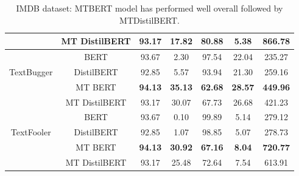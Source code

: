 \documentclass[%
	BCOR=8mm, %
	DIV=12,
	toc=bibliography, %
	toc=listof, %
	oneside, %
	egregdoesnotlikesansseriftitles, %
	]{scrbook}
\begin{document}
\begin{table}[H]
{\begin{tabular}{|c|c|c|c|c|c|c|}
                & MT DistilBERT &                93.17 &                    17.82 &                  80.88 &                      5.38 &           866.78 \\
                \midrule
                 & BERT &                93.67 &                     2.30 &                  97.54 &                     22.04 &           235.27 \\
               TextBugger & DistilBERT &                92.85 &                     5.57 &                  93.94 &                     21.30 &           259.16 \\
                & MT BERT &                \textbf{94.13} &                    \textbf{35.13} &                 \textbf{ 62.68} &                     \textbf{28.57} &           \textbf{449.96} \\
                & MT DistilBERT &                93.17 &                    30.07 &                  67.73 &                     26.68 &           421.23 \\
                \midrule
                 & BERT &                93.67 &                     0.10 &                  99.89 &                      5.14 &           279.12 \\
                TextFooler & DistilBERT &                92.85 &                     1.07 &                  98.85 &                      5.07 &           278.73 \\
                & MT BERT &                \textbf{94.13} &                   \textbf{ 30.92}&                  \textbf{67.16} &                      \textbf{8.04} &           \textbf{720.77} \\
                & MT DistilBERT &                93.17 &                    25.48 &                  72.64 &                      7.54 &           613.91 \\
 \bottomrule
 \end{tabular}
    }
    \caption[Experiment Result of IMDB dataset]{IMDB dataset: MTBERT model has performed well overall followed by MTDistilBERT. }
    \label{table:IMDBExpRes}
\end{table}
\end{document}
